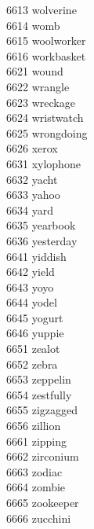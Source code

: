 6613 wolverine \\
6614 womb \\
6615 woolworker \\
6616 workbasket \\
6621 wound \\
6622 wrangle \\
6623 wreckage \\
6624 wristwatch \\
6625 wrongdoing \\
6626 xerox \\
6631 xylophone \\
6632 yacht \\
6633 yahoo \\
6634 yard \\
6635 yearbook \\
6636 yesterday \\
6641 yiddish \\
6642 yield \\
6643 yoyo \\
6644 yodel \\
6645 yogurt \\
6646 yuppie \\
6651 zealot \\
6652 zebra \\
6653 zeppelin \\
6654 zestfully \\
6655 zigzagged \\
6656 zillion \\
6661 zipping \\
6662 zirconium \\
6663 zodiac \\
6664 zombie \\
6665 zookeeper \\
6666 zucchini \\
